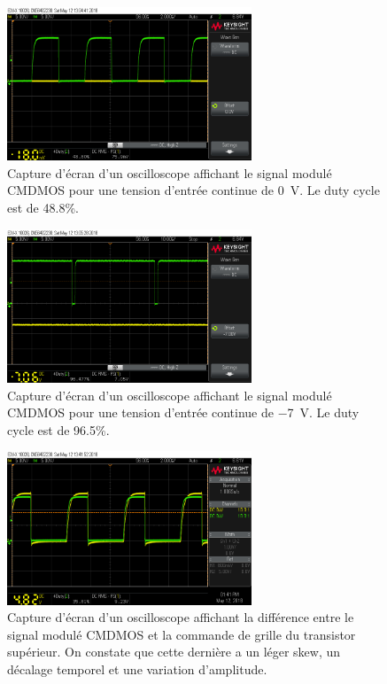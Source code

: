 \documentclass[10pt, oneside, a4paper]{article}
\begin{document}
\begin{figure}[p]
	\centering
	\includegraphics[width=0.65\textwidth]{image/12-05/scope_3.png}
	\caption{Capture d'écran d'un oscilloscope affichant le signal modulé CMDMOS pour une
			 tension d'entrée continue de \SI{0}{\volt}. Le duty cycle est de \num{48.8}\%.}
	\label{fig:scope-3}
\end{figure}

\begin{figure}[p]
	\centering
	\includegraphics[width=0.65\textwidth]{image/12-05/scope_4.png}
	\caption{Capture d'écran d'un oscilloscope affichant le signal modulé CMDMOS pour une
			 tension d'entrée continue de \SI{-7}{\volt}. Le duty cycle est de \num{96.5}\%.}
	\label{fig:scope-4}
\end{figure}

\begin{figure}[p]
	\centering
	\includegraphics[width=0.65\textwidth]{image/12-05/scope_5.png}
	\caption{Capture d'écran d'un oscilloscope affichant la différence entre le signal
			 modulé CMDMOS et la commande de grille du transistor supérieur.
			 On constate que cette dernière a un léger \og{}skew\fg{}, un décalage
			 temporel et une variation d'amplitude.}
	\label{fig:scope-5}
\end{figure}
\end{document}
